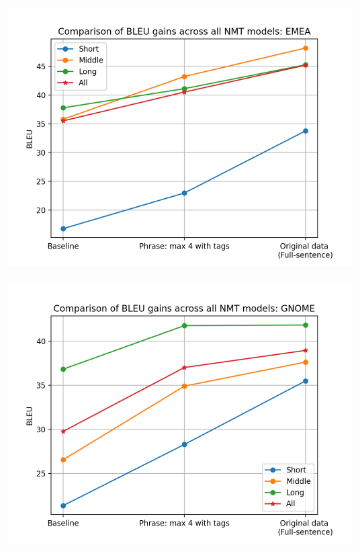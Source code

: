 \begin{figure}[h!]
\centering
\begin{subfigure}{.48\textwidth}
  \centering
  \includegraphics[scale=0.48]{images/EMEA_different_lengths.png}
    \caption{}
    \label{fig:EMEA_different_lengths}
\end{subfigure}
\begin{subfigure}{.48\textwidth}
  \centering
  \includegraphics[scale=0.48]{images/GNOME_different_lengths.png}
    \caption{}
    \label{fig:GNOME_different_lengths}
\end{subfigure}
\begin{subfigure}{.48\textwidth}
  \centering

\end{subfigure}
\end{figure}
